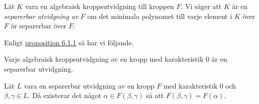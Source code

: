 \documentclass{article}
\theoremstyle{definition}
\begin{document}
\begin{mydef}{}{}
  Låt $K$ vara en algebraisk kroppsutvidgning till kroppen $F$. Vi säger att $K$ är en \textit{separerbar utvidgning av} $F$ om 
  det minimala polynomet till varje element i $K$ över $F$ är separerbar över $F$. 
\end{mydef}

Enligt \hyperlink{irrsep}{proposition 6.1.1} så har vi följande. 
\hypertarget{prop7.1.2}{}
\begin{myprop}{}{}
  Varje algebraisk kroppsutvidgning av en kropp med karakteristik 0 är en separerbar utvidgning. 
\end{myprop}

\hypertarget{lemma7.1.3}{}
\begin{mylemma}{}{}
  Låt $L$ vara en separerbar utvidgning av en kropp $F$ med karakteristik 0 och $\beta, \gamma \in L$. Då existerar det 
  något $\alpha \in F(\beta, \gamma)$ så att $F(\beta, \gamma) = F(\alpha)$.
\end{mylemma}
\end{document}
